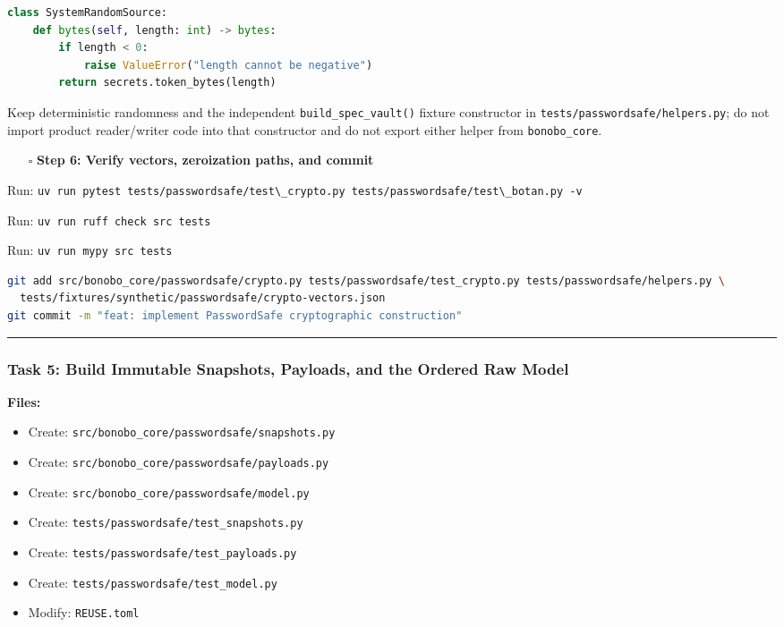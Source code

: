 \documentclass[
  letterpaper,
]{article}
\newcommand{\passthrough}[1]{#1}
\providecommand{\tightlist}{%
  \setlength{\itemsep}{0pt}\setlength{\parskip}{0pt}}
\begin{document}
\begin{lstlisting}[language=Python]
class SystemRandomSource:
    def bytes(self, length: int) -> bytes:
        if length < 0:
            raise ValueError("length cannot be negative")
        return secrets.token_bytes(length)
\end{lstlisting}

Keep deterministic randomness and the independent \nolinkurl{build_spec_vault()} fixture constructor in
\nolinkurl{tests/passwordsafe/helpers.py}; do not import product reader/writer code into that constructor and do not
export either helper from \nolinkurl{bonobo_core}.

\begin{itemize}
\tightlist
\item[$\square$]
  \textbf{Step 6: Verify vectors, zeroization paths, and commit}
\end{itemize}

Run: \passthrough{\lstinline!uv run pytest tests/passwordsafe/test\_crypto.py tests/passwordsafe/test\_botan.py -v!}

Run: \passthrough{\lstinline!uv run ruff check src tests!}

Run: \passthrough{\lstinline!uv run mypy src tests!}

\begin{lstlisting}[language=bash]
git add src/bonobo_core/passwordsafe/crypto.py tests/passwordsafe/test_crypto.py tests/passwordsafe/helpers.py \
  tests/fixtures/synthetic/passwordsafe/crypto-vectors.json
git commit -m "feat: implement PasswordSafe cryptographic construction"
\end{lstlisting}

\begin{center}\rule{0.5\linewidth}{0.5pt}\end{center}

\subsubsection{Task 5: Build Immutable Snapshots, Payloads, and the Ordered Raw
Model}\label{task-5-build-immutable-snapshots-payloads-and-the-ordered-raw-model}

\textbf{Files:}

\begin{itemize}
\tightlist
\item
  Create: \nolinkurl{src/bonobo_core/passwordsafe/snapshots.py}
\item
  Create: \nolinkurl{src/bonobo_core/passwordsafe/payloads.py}
\item
  Create: \nolinkurl{src/bonobo_core/passwordsafe/model.py}
\item
  Create: \nolinkurl{tests/passwordsafe/test_snapshots.py}
\item
  Create: \nolinkurl{tests/passwordsafe/test_payloads.py}
\item
  Create: \nolinkurl{tests/passwordsafe/test_model.py}
\item
  Modify: \nolinkurl{REUSE.toml}
\end{itemize}
\end{document}
